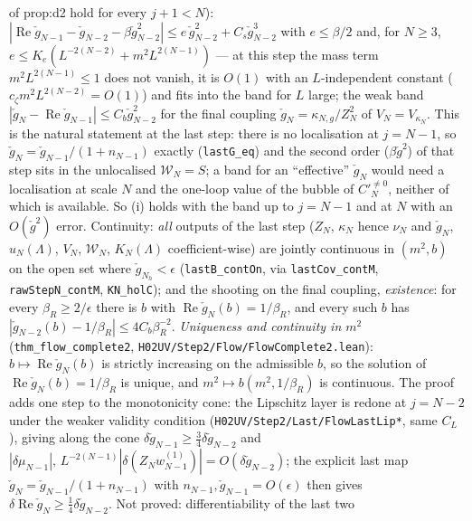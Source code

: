 \documentclass[11pt]{amsart}
\theoremstyle{definition}
\theoremstyle{remark}
\numberwithin{equation}{section}
\begin{document}
\begin{itemize}
\begin{itemize}
    of prop:d2 hold for every $j+1<N$): $|\operatorname{Re}\check g_{N-1}-\check g_{N-2}-\beta\check g_{N-2}^2|\le
    e\,\check g_{N-2}^2+C_s\check g_{N-2}^3$ with $e\le\beta/2$ and, for $N\ge3$,
    $e\le K_e(L^{-2(N-2)}+m^2L^{2(N-1)})$ --- at this step the mass term $m^2L^{2(N-1)}\le1$ does not vanish,
    it is $O(1)$ with an $L$-independent constant ($c_\zeta m^2L^{2(N-2)}=O(1)$) and fits into the band for $L$
    large; the weak band $|\check g_N-\operatorname{Re}\check g_{N-1}|\le C_b\check g_{N-2}^2$ for the final
    coupling $\check g_N=\kappa_{N,g}/Z_N^2$ of $V_N=V_{\kappa_N}$. This is the natural statement at the last
    step: there is no localisation at $j=N-1$, so $\check g_N=\check g_{N-1}/(1+n_{N-1})$ exactly
    (\texttt{lastG\_eq}) and the second order ($\beta\check g^2$) of that step sits in the unlocalised
    $\mathcal W_N=S$; a band for an ``effective'' $\check g_N$ would need a localisation at scale $N$ and the
    one-loop value of the bubble of $C'^{\ne0}_N$, neither of which is available. So (i) holds with the band up to
    $j=N-1$ and at $N$ with an $O(\check g^2)$ error. Continuity: \emph{all} outputs of the last step
    ($Z_N$, $\kappa_N$ hence $\nu_N$ and $\check g_N$, $u_N(\Lambda)$, $V_N$, $\mathcal W_N$, $K_N(\Lambda)$
    coefficient-wise) are jointly continuous in $(m^2,b)$ on the open set where $\check g_{N_h}<\epsilon$
    (\texttt{lastB\_contOn}, via \texttt{lastCov\_contM}, \texttt{rawStepN\_contM}, \texttt{KN\_holC}); and
    the shooting on the final coupling, \emph{existence}: for every $\beta_R\ge2/\epsilon$ there is $b$ with
    $\operatorname{Re}\check g_N(b)=1/\beta_R$, and every such $b$ has $|\check g_{N-2}(b)-1/\beta_R|\le
    4C_b\beta_R^{-2}$. \emph{Uniqueness and continuity in $m^2$} (\texttt{thm\_flow\_complete2},
    \texttt{H02UV/Step2/Flow/FlowComplete2.lean}): $b\mapsto\operatorname{Re}\check g_N(b)$ is strictly increasing on the
    admissible $b$, so the solution of $\operatorname{Re}\check g_N(b)=1/\beta_R$ is unique, and
    $m^2\mapsto b(m^2,1/\beta_R)$ is continuous. The proof adds one step to the monotonicity cone: the Lipschitz
    layer is redone at $j=N-2$ under the weaker validity condition (\texttt{H02UV/Step2/Last/FlowLastLip*}, same $C_L$),
    giving along the cone $\delta\check g_{N-1}\ge\frac34\delta\check g_{N-2}$ and
    $|\delta\mu_{N-1}|,\,L^{-2(N-1)}|\delta(Z_Nw^{(1)}_{N-1})|=O(\delta\check g_{N-2})$; the explicit last map
    $\check g_N=\check g_{N-1}/(1+n_{N-1})$ with $n_{N-1},\check g_{N-1}=O(\epsilon)$ then gives
    $\delta\operatorname{Re}\check g_N\ge\frac14\delta\check g_{N-2}$. Not proved: differentiability of the last two

\end{itemize}
\end{itemize}
\end{document}
